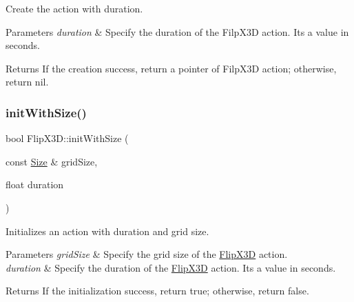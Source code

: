 Create the action with duration. 


\begin{DoxyParams}{Parameters}
{\em duration} & Specify the duration of the Filp\+X3D action. It\textquotesingle{}s a value in seconds. \\
\hline
\end{DoxyParams}
\begin{DoxyReturn}{Returns}
If the creation success, return a pointer of Filp\+X3D action; otherwise, return nil. 
\end{DoxyReturn}
\mbox{\label{classFlipX3D_a539e3423b9cf0b06695b10bc463aef3c}} 
\subsubsection{\texorpdfstring{init\+With\+Size()}{initWithSize()}\hspace{0.1cm}{\footnotesize\ttfamily [1/2]}}
{\footnotesize\ttfamily bool Flip\+X3\+D\+::init\+With\+Size (\begin{DoxyParamCaption}\item[{const \hyperlink{classSize}{Size} \&}]{grid\+Size,  }\item[{float}]{duration }\end{DoxyParamCaption})\hspace{0.3cm}{\ttfamily [virtual]}}



Initializes an action with duration and grid size. 


\begin{DoxyParams}{Parameters}
{\em grid\+Size} & Specify the grid size of the \hyperlink{classFlipX3D}{Flip\+X3D} action. \\
\hline
{\em duration} & Specify the duration of the \hyperlink{classFlipX3D}{Flip\+X3D} action. It\textquotesingle{}s a value in seconds. \\
\hline
\end{DoxyParams}
\begin{DoxyReturn}{Returns}
If the initialization success, return true; otherwise, return false. 
\end{DoxyReturn}
\mbox{\label{classFlipX3D_a42241dd3304278fdd87ffc4f6d48b942}} 
